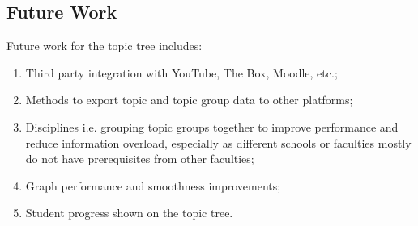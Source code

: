 \subsection{Future Work}
Future work for the topic tree includes:

\begin{enumerate}
    \item Third party integration with YouTube, The Box, Moodle, etc.;
    \item Methods to export topic and topic group data to other platforms;
    \item Disciplines i.e. grouping topic groups together to improve performance and reduce information overload, especially as different schools or faculties mostly do not have prerequisites from other faculties;
    \item Graph performance and smoothness improvements;
    \item Student progress shown on the topic tree.
\end{enumerate} 

